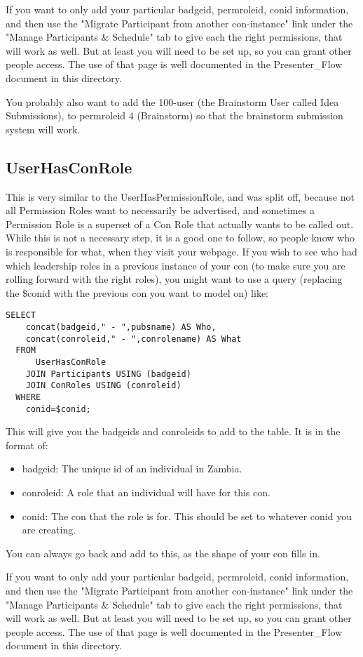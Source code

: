 \documentclass[captions=tablesignature]{scrartcl}
\begin{document}
If you want to only add your particular badgeid, permroleid, conid
information, and then use the "Migrate Participant from another
con-instance" link under the "Manage Participants \& Schedule" tab 
to give each the right permissions, that will work as well.  But at
least you will need to be set up, so you can grant other people
access.  The use of that page is well documented in the
Presenter\_Flow document in this directory.

You probably also want to add the 100-user (the Brainstorm User
called Idea Submissions), to permroleid 4 (Brainstorm) so that the
brainstorm submission system will work.

\subsection{UserHasConRole}
\label{sec-11-2}
This is very similar to the UserHasPermissionRole, and was split
off, because not all Permission Roles want to necessarily be
advertised, and sometimes a Permission Role is a superset of a Con
Role that actually wants to be called out.  While this is not a
necessary step, it is a good one to follow, so people know who is
responsible for what, when they visit your webpage. If you wish to
see who had which leadership roles in a previous instance of your
con (to make sure you are rolling forward with the right roles),
you might want to use a query (replacing the \$conid with the
previous con you want to model on) like:
\begin{verbatim}
SELECT
    concat(badgeid," - ",pubsname) AS Who,
    concat(conroleid," - ",conrolename) AS What
  FROM
      UserHasConRole
    JOIN Participants USING (badgeid)
    JOIN ConRoles USING (conroleid)
  WHERE
    conid=$conid;
\end{verbatim}
This will give you the badgeids and conroleids to add to the
table.  It is in the format of:
\begin{itemize}
\item badgeid: The unique id of an individual in Zambia.
\item conroleid: A role that an individual will have for this con.
\item conid: The con that the role is for.  This should be set to
whatever conid you are creating.
\end{itemize}

You can always go back and add to this, as the shape of your con
fills in.

If you want to only add your particular badgeid, permroleid, conid
information, and then use the "Migrate Participant from another
con-instance" link under the "Manage Participants \& Schedule" tab 
to give each the right permissions, that will work as well.  But at
least you will need to be set up, so you can grant other people
access.  The use of that page is well documented in the
Presenter\_Flow document in this directory.
\end{document}
